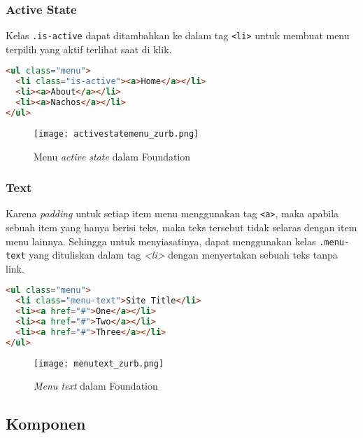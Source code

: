 \begin{itemize}
\subsubsection{Active State}
Kelas \texttt{.is-active} dapat ditambahkan ke dalam tag \texttt{<li>} untuk membuat menu terpilih yang aktif terlihat saat di klik. 

\begin{lstlisting}[language=HTML, frame=single, basicstyle=\small] 
<ul class="menu">
  <li class="is-active"><a>Home</a></li>
  <li><a>About</a></li>
  <li><a>Nachos</a></li>
</ul>
\end{lstlisting}

\begin{figure} [H]
	\centering  
	\texttt{[image: activestatemenu\_zurb.png]}  
	\caption{Menu \textit{active state} dalam Foundation}
\end{figure}


\subsubsection{Text}
Karena \textit{padding} untuk setiap item menu menggunakan tag \texttt{<a>}, maka apabila sebuah item yang hanya berisi teks, maka teks tersebut tidak selaras dengan item menu lainnya. Sehingga untuk menyiasatinya, dapat menggunakan kelas \texttt{.menu-text} yang dituliskan dalam tag \textit{<li>} dengan menyertakan sebuah teks tanpa link.

\begin{lstlisting}[language=HTML, frame=single, basicstyle=\small]
 <ul class="menu">
  <li class="menu-text">Site Title</li>
  <li><a href="#">One</a></li>
  <li><a href="#">Two</a></li>
  <li><a href="#">Three</a></li>
</ul>
\end{lstlisting}

\begin{figure} [H]
	\centering  
	\texttt{[image: menutext\_zurb.png]}  
	\caption{\textit{Menu text} dalam Foundation}
\end{figure}

\subsection{Komponen}
 

\end{itemize}
